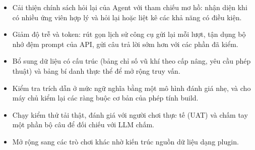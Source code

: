 \begin{itemize}
    \item Cải thiện chính sách hỏi lại của Agent với tham chiếu mơ hồ: nhận diện khi có nhiều ứng viên hợp lý và hỏi lại hoặc liệt kê các khả năng có điều kiện.
    \item Giảm độ trễ và token: rút gọn lịch sử công cụ gửi lại mỗi lượt, tận dụng bộ nhớ đệm prompt của API, gửi câu trả lời sớm hơn với các phần đã kiểm.
    \item Bổ sung dữ liệu có cấu trúc (bảng chỉ số vũ khí theo cấp nâng, yêu cầu phép thuật) và bảng bí danh thực thể để mở rộng truy vấn.
    \item Kiểm tra trích dẫn ở mức ngữ nghĩa bằng một mô hình đánh giá nhẹ, và cho máy chủ kiểm lại các ràng buộc cơ bản của phép tính build.
    \item Chạy kiểm thử tải thật, đánh giá với người chơi thực tế (UAT) và chấm tay một phần bộ câu để đối chiếu với LLM chấm.
    \item Mở rộng sang các trò chơi khác nhờ kiến trúc nguồn dữ liệu dạng plugin.
\end{itemize}
